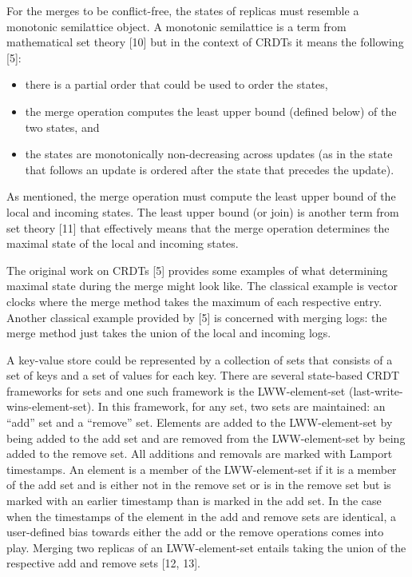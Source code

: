 \documentclass[sigconf,nonacm,10pt]{acmart}
\begin{document}
For the merges to be conflict-free, the states of replicas must resemble a monotonic semilattice object. A monotonic semilattice is a term from mathematical set theory [10] but in the context of CRDTs it means the following [5]:
\begin{itemize}
 \item there is a partial order that could be used to order the states,
 \item the merge operation computes the least upper bound (defined below) of the two states, and
 \item the states are monotonically non-decreasing across updates (as in the state that follows an update is ordered after the state that precedes the update).
\end{itemize}

As mentioned, the merge operation must compute the least upper bound of the local and incoming states. The least upper bound (or join) is another term from set theory [11] that effectively means that the merge operation determines the maximal state of the local and incoming states.

The original work on CRDTs [5] provides some examples of what determining maximal state during the merge might look like. The classical example is vector clocks where the merge method takes the maximum of each respective entry. Another classical example provided by [5] is concerned with merging logs: the merge method just takes the union of the local and incoming logs.

A key-value store could be represented by a collection of sets that consists of a set of keys and a set of values for each key. There are several state-based CRDT frameworks for sets and one such framework is the LWW-element-set (last-write-wins-element-set). In this framework, for any set, two sets are maintained: an ``add'' set and a ``remove'' set. Elements are added to the LWW-element-set by being added to the add set and are removed from the LWW-element-set by being added to the remove set. All additions and removals are marked with Lamport timestamps. An element is a member of the LWW-element-set if it is a member of the add set and is either not in the remove set or is in the remove set but is marked with an earlier timestamp than is marked in the add set. In the case when the timestamps of the element in the add and remove sets are identical, a user-defined bias towards either the add or the remove operations comes into play. Merging two replicas of an LWW-element-set entails taking the union of the respective add and remove sets [12, 13].
\end{document}
